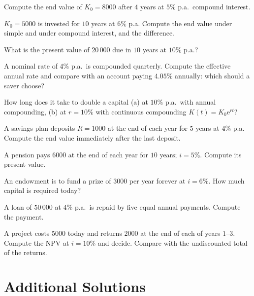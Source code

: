 \begin{problems}
  \item Compute the end value of $K_{0}=8000$ after $4$ years at $5\%$
        p.a.\ compound interest.
  \item $K_{0}=5000$ is invested for $10$ years at $6\%$ p.a. Compute
        the end value under simple and under compound interest, and the
        difference.
  \item What is the present value of $20\,000$ due in $10$ years at
        $10\%$ p.a.?
  \item A nominal rate of $4\%$ p.a.\ is compounded quarterly. Compute
        the effective annual rate and compare with an account paying
        $4.05\%$ annually: which should a saver choose?
  \item How long does it take to double a capital (a) at $10\%$ p.a.\
        with annual compounding, (b) at $r=10\%$ with continuous
        compounding $K(t)=K_{0}\mathrm{e}^{rt}$?
  \item A savings plan deposits $R=1000$ at the end of each year for
        $5$ years at $4\%$ p.a. Compute the end value immediately after
        the last deposit.
  \item A pension pays $6000$ at the end of each year for $10$ years;
        $i=5\%$. Compute its present value.
  \item An endowment is to fund a prize of $3000$ per year forever at
        $i=6\%$. How much capital is required today?
  \item A loan of $50\,000$ at $4\%$ p.a.\ is repaid by five equal
        annual payments. Compute the payment.
  \item A project costs $5000$ today and returns $2000$ at the end of
        each of years $1$--$3$. Compute the NPV at $i=10\%$ and decide.
        Compare with the undiscounted total of the returns.
\end{problems}

\section{Additional Solutions}

